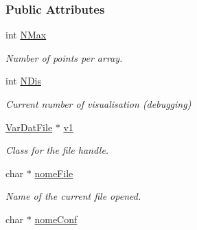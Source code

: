 \subsubsection*{Public Attributes}
\begin{DoxyCompactItemize}
\item 
int \hyperlink{classElementiGrafici_a35e5db5990993f09236122f4dfaf7bc3}{N\+Max}\hypertarget{classElementiGrafici_a35e5db5990993f09236122f4dfaf7bc3}{}\label{classElementiGrafici_a35e5db5990993f09236122f4dfaf7bc3}

\begin{DoxyCompactList}\small\item\em Number of points per array. \end{DoxyCompactList}\item 
int \hyperlink{classElementiGrafici_a4e1e3a7469a7fc5af310a17c2c2c787a}{N\+Dis}\hypertarget{classElementiGrafici_a4e1e3a7469a7fc5af310a17c2c2c787a}{}\label{classElementiGrafici_a4e1e3a7469a7fc5af310a17c2c2c787a}

\begin{DoxyCompactList}\small\item\em Current number of visualisation (debugging) \end{DoxyCompactList}\item 
\hyperlink{classVarDatFile}{Var\+Dat\+File} $\ast$ \hyperlink{classElementiGrafici_af8d0da3e35bb5e28aba9329efffbfb95}{v1}\hypertarget{classElementiGrafici_af8d0da3e35bb5e28aba9329efffbfb95}{}\label{classElementiGrafici_af8d0da3e35bb5e28aba9329efffbfb95}

\begin{DoxyCompactList}\small\item\em Class for the file handle. \end{DoxyCompactList}\item 
char $\ast$ \hyperlink{classElementiGrafici_ae062c77de5b1cd6767e9b53846eb76fe}{nome\+File}\hypertarget{classElementiGrafici_ae062c77de5b1cd6767e9b53846eb76fe}{}\label{classElementiGrafici_ae062c77de5b1cd6767e9b53846eb76fe}

\begin{DoxyCompactList}\small\item\em Name of the current file opened. \end{DoxyCompactList}\item 
char $\ast$ \hyperlink{classElementiGrafici_a8bf6d3f7358b88169b52d2b2f03a94f6}{nome\+Conf}\hypertarget{classElementiGrafici_a8bf6d3f7358b88169b52d2b2f03a94f6}{}\label{classElementiGrafici_a8bf6d3f7358b88169b52d2b2f03a94f6}


\end{DoxyCompactItemize}
